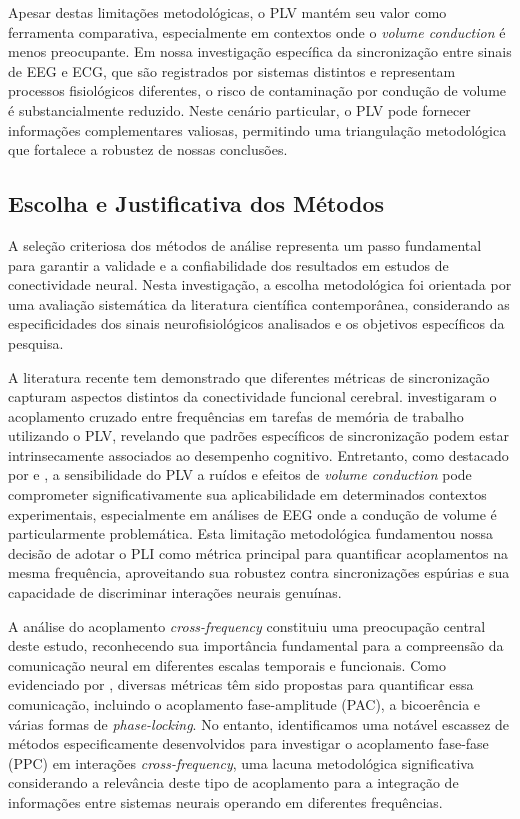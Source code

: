 Apesar destas limitações metodológicas, o PLV mantém seu valor como ferramenta comparativa, especialmente em contextos onde o \textit{volume conduction} é menos preocupante. Em nossa investigação específica da sincronização entre sinais de EEG e ECG, que são registrados por sistemas distintos e representam processos fisiológicos diferentes, o risco de contaminação por condução de volume é substancialmente reduzido. Neste cenário particular, o PLV pode fornecer informações complementares valiosas, permitindo uma triangulação metodológica que fortalece a robustez de nossas conclusões.

\subsection{Escolha e Justificativa dos Métodos}
A seleção criteriosa dos métodos de análise representa um passo fundamental para garantir a validade e a confiabilidade dos resultados em estudos de conectividade neural. Nesta investigação, a escolha metodológica foi orientada por uma avaliação sistemática da literatura científica contemporânea, considerando as especificidades dos sinais neurofisiológicos analisados e os objetivos específicos da pesquisa.

A literatura recente tem demonstrado que diferentes métricas de sincronização capturam aspectos distintos da conectividade funcional cerebral.  investigaram o acoplamento cruzado entre frequências em tarefas de memória de trabalho utilizando o PLV, revelando que padrões específicos de sincronização podem estar intrinsecamente associados ao desempenho cognitivo. Entretanto, como destacado por  e , a sensibilidade do PLV a ruídos e efeitos de \textit{volume conduction} pode comprometer significativamente sua aplicabilidade em determinados contextos experimentais, especialmente em análises de EEG onde a condução de volume é particularmente problemática. Esta limitação metodológica fundamentou nossa decisão de adotar o PLI como métrica principal para quantificar acoplamentos na mesma frequência, aproveitando sua robustez contra sincronizações espúrias e sua capacidade de discriminar interações neurais genuínas.

A análise do acoplamento \textit{cross-frequency} constituiu uma preocupação central deste estudo, reconhecendo sua importância fundamental para a compreensão da comunicação neural em diferentes escalas temporais e funcionais. Como evidenciado por , diversas métricas têm sido propostas para quantificar essa comunicação, incluindo o acoplamento fase-amplitude (PAC), a bicoerência e várias formas de \textit{phase-locking}. No entanto, identificamos uma notável escassez de métodos especificamente desenvolvidos para investigar o acoplamento fase-fase (PPC) em interações \textit{cross-frequency}, uma lacuna metodológica significativa considerando a relevância deste tipo de acoplamento para a integração de informações entre sistemas neurais operando em diferentes frequências.

